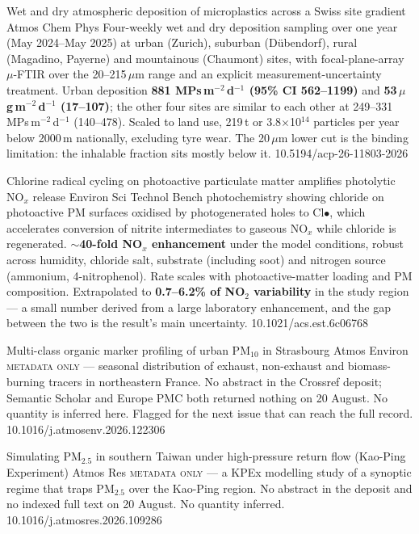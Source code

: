 \documentclass[10pt]{article}
\begin{document}
{Wet and dry atmospheric deposition of microplastics across a Swiss site gradient}
{Atmos Chem Phys}
{Four-weekly wet and dry deposition sampling over one year (May 2024--May 2025) at urban
(Zurich), suburban (D\"ubendorf), rural (Magadino, Payerne) and mountainous (Chaumont)
sites, with focal-plane-array $\mu$-FTIR over the 20--215\,$\mu$m range and an explicit
measurement-uncertainty treatment. Urban deposition \textbf{881 MPs\,m$^{-2}$\,d$^{-1}$
(95\% CI 562--1199)} and \textbf{53\,$\mu$g\,m$^{-2}$\,d$^{-1}$ (17--107)}; the other four
sites are similar to each other at 249--331 MPs\,m$^{-2}$\,d$^{-1}$ (140--478). Scaled to
land use, 219\,t or 3.8$\times$10$^{14}$ particles per year below 2000\,m nationally,
excluding tyre wear. The 20\,$\mu$m lower cut is the binding limitation: the
inhalable fraction sits mostly below it.}
{10.5194/acp-26-11803-2026}

{Chlorine radical cycling on photoactive particulate matter amplifies photolytic NO$_x$ release}
{Environ Sci Technol}
{Bench photochemistry showing chloride on photoactive PM surfaces oxidised by
photogenerated holes to Cl$\bullet$, which accelerates conversion of nitrite intermediates
to gaseous NO$_x$ while chloride is regenerated. \textbf{$\sim$40-fold NO$_x$ enhancement}
under the model conditions, robust across humidity, chloride salt, substrate (including
soot) and nitrogen source (ammonium, 4-nitrophenol). Rate scales with photoactive-matter
loading and PM composition. Extrapolated to \textbf{0.7--6.2\% of NO$_2$ variability} in
the study region --- a small number derived from a large laboratory enhancement, and the
gap between the two is the result's main uncertainty.}
{10.1021/acs.est.6c06768}

{Multi-class organic marker profiling of urban PM$_{10}$ in Strasbourg}
{Atmos Environ}
{\textsc{metadata only} --- seasonal distribution of exhaust, non-exhaust and
biomass-burning tracers in northeastern France. No abstract in the Crossref deposit;
Semantic Scholar and Europe PMC both returned nothing on 20 August. No quantity is
inferred here. Flagged for the next issue that can reach the full record.}
{10.1016/j.atmosenv.2026.122306}

{Simulating PM$_{2.5}$ in southern Taiwan under high-pressure return flow (Kao-Ping Experiment)}
{Atmos Res}
{\textsc{metadata only} --- a KPEx modelling study of a synoptic regime that traps
PM$_{2.5}$ over the Kao-Ping region. No abstract in the deposit and no indexed full text
on 20 August. No quantity inferred.}
{10.1016/j.atmosres.2026.109286}
\end{document}
